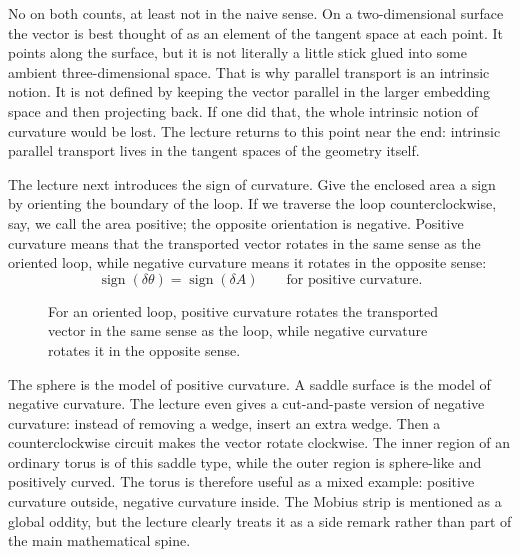 No on both counts, at least not in the naive sense. On a two-dimensional surface the vector is best thought of as an element of the tangent space at each point. It points along the surface, but it is not literally a little stick glued into some ambient three-dimensional space. That is why parallel transport is an intrinsic notion. It is not defined by keeping the vector parallel in the larger embedding space and then projecting back. If one did that, the whole intrinsic notion of curvature would be lost. The lecture returns to this point near the end: intrinsic parallel transport lives in the tangent spaces of the geometry itself.

The lecture next introduces the sign of curvature. Give the enclosed area a sign by orienting the boundary of the loop. If we traverse the loop counterclockwise, say, we call the area positive; the opposite orientation is negative. Positive curvature means that the transported vector rotates in the same sense as the oriented loop, while negative curvature means it rotates in the opposite sense:
\begin{equation}
\operatorname{sign}(\delta\theta)=\operatorname{sign}(\delta A)
\qquad \text{for positive curvature.}
\end{equation}

\begin{figure}[h]
\centering
{}
\caption{For an oriented loop, positive curvature rotates the transported vector in the same sense as the loop, while negative curvature rotates it in the opposite sense.}
\end{figure}

The sphere is the model of positive curvature. A saddle surface is the model of negative curvature. The lecture even gives a cut-and-paste version of negative curvature: instead of removing a wedge, insert an extra wedge. Then a counterclockwise circuit makes the vector rotate clockwise. The inner region of an ordinary torus is of this saddle type, while the outer region is sphere-like and positively curved. The torus is therefore useful as a mixed example: positive curvature outside, negative curvature inside. The Mobius strip is mentioned as a global oddity, but the lecture clearly treats it as a side remark rather than part of the main mathematical spine.


